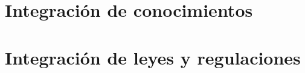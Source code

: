 \documentclass[12pt]{article} %
\begin{document}
\section{Integración de conocimientos}
\section{Integración de leyes y regulaciones}

\newpage


\nocite{*}

\end{document}
